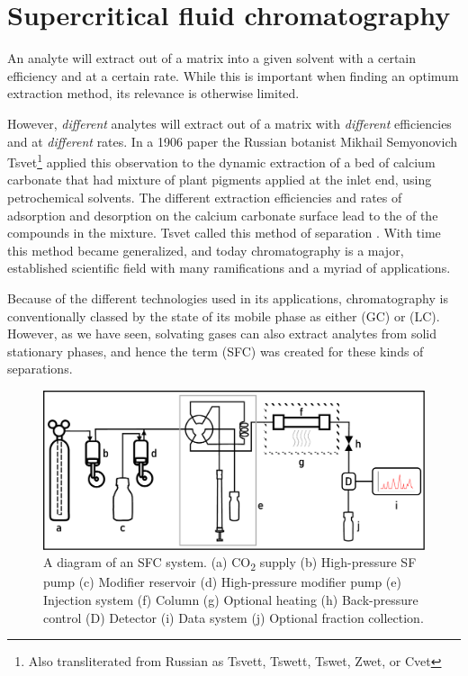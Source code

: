 \section{Supercritical fluid chromatography}

An analyte will extract out of a matrix into a given solvent with a certain
efficiency and at a certain rate. While this is important when finding an
optimum extraction method, its relevance is otherwise limited.

However, \textit{different} analytes will extract out of a matrix with
\textit{different} efficiencies and at \textit{different} rates. In a 1906 paper
the Russian botanist Mikhail Semyonovich Tsvet\footnote{Also transliterated from
Russian as Tsvett, Tswett, Tswet, Zwet, or Cvet} applied this observation to the
dynamic extraction of a bed of calcium carbonate that had mixture of plant
pigments applied at the inlet end, using petrochemical solvents. The different
extraction efficiencies and rates of adsorption and desorption on the calcium
carbonate surface lead to the  of the compounds in the
mixture. Tsvet called this method of separation 
\autocite{Ettre1993,Ettre1993a}. With time this method became generalized, and
today chromatography is a major, established scientific field with many
ramifications and a myriad of applications.

Because of the different technologies used in its applications, chromatography
is conventionally classed by the state of its mobile phase as either
 (GC) or  (LC).
However, as we have seen, solvating gases can also extract analytes from solid
stationary phases, and hence the term  (SFC) was created for these kinds of separations.

\begin{figure}
\centering
\includegraphics[width=\textwidth]{Figures/SFC_System}
\decoRule
\caption[SFC system diagram]{A diagram of an SFC system. (a) CO\textsubscript{2}
supply (b) High-pressure SF pump (c) Modifier reservoir (d) High-pressure
modifier pump (e) Injection system (f) Column (g) Optional heating (h)
Back-pressure control (D) Detector (i) Data system (j) Optional fraction
collection.}
\label{fig:sfcdiagram}

\end{figure}

